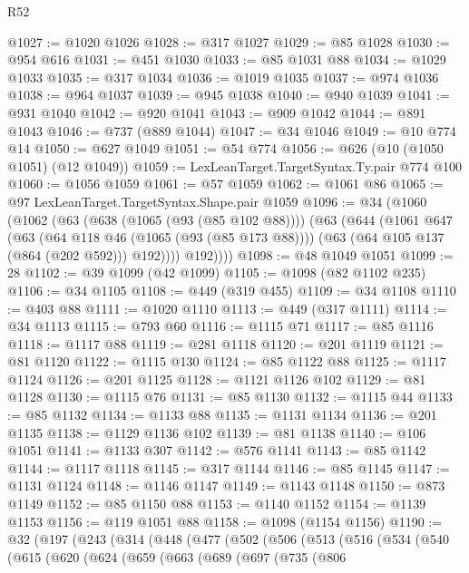 \begin{lexlean}{R52}
\begin{coremodule}
@1027 := @1020 @1026
@1028 := @317 @1027
@1029 := @85 @1028
@1030 := @954 @616
@1031 := @451 @1030
@1033 := @85 @1031 @88
@1034 := @1029 @1033
@1035 := @317 @1034
@1036 := @1019 @1035
@1037 := @974 @1036
@1038 := @964 @1037
@1039 := @945 @1038
@1040 := @940 @1039
@1041 := @931 @1040
@1042 := @920 @1041
@1043 := @909 @1042
@1044 := @891 @1043
@1046 := @737 (@889 @1044)
@1047 := @34 @1046
@1049 := @10 @774 @14
@1050 := @627 @1049
@1051 := @54 @774
@1056 := @626 (@10 (@1050 @1051) (@12 @1049))
@1059 := LexLeanTarget.TargetSyntax.Ty.pair @774 @100
@1060 := @1056 @1059
@1061 := @57 @1059
@1062 := @1061 @86
@1065 := @97 LexLeanTarget.TargetSyntax.Shape.pair @1059
@1096 := @34
    (@1060
      (@1062
        (@63
          (@638 (@1065 (@93 (@85 @102 @88))))
          (@63
            (@644
              (@1061
                @647
                (@63
                  (@64 @118 @46 (@1065 (@93 (@85 @173 @88))))
                  (@63 (@64 @105 @137 (@864 (@202 @592))) @192))))
            @192))))
@1098 := @48 @1049 @1051
@1099 := 28
@1102 := @39 @1099 (@42 @1099)
@1105 := @1098 (@82 @1102 @235)
@1106 := @34 @1105
@1108 := @449 (@319 @455)
@1109 := @34 @1108
@1110 := @403 @88
@1111 := @1020 @1110
@1113 := @449 (@317 @1111)
@1114 := @34 @1113
@1115 := @793 @60
@1116 := @1115 @71
@1117 := @85 @1116
@1118 := @1117 @88
@1119 := @281 @1118
@1120 := @201 @1119
@1121 := @81 @1120
@1122 := @1115 @130
@1124 := @85 @1122 @88
@1125 := @1117 @1124
@1126 := @201 @1125
@1128 := @1121 @1126 @102
@1129 := @81 @1128
@1130 := @1115 @76
@1131 := @85 @1130
@1132 := @1115 @44
@1133 := @85 @1132
@1134 := @1133 @88
@1135 := @1131 @1134
@1136 := @201 @1135
@1138 := @1129 @1136 @102
@1139 := @81 @1138
@1140 := @106 @1051
@1141 := @1133 @307
@1142 := @576 @1141
@1143 := @85 @1142
@1144 := @1117 @1118
@1145 := @317 @1144
@1146 := @85 @1145
@1147 := @1131 @1124
@1148 := @1146 @1147
@1149 := @1143 @1148
@1150 := @873 @1149
@1152 := @85 @1150 @88
@1153 := @1140 @1152
@1154 := @1139 @1153
@1156 := @119 @1051 @88
@1158 := @1098 (@1154 @1156)
@1190 := @32
    (@197
      (@243
        (@314
          (@448
            (@477
              (@502
                (@506
                  (@513
                    (@516
                      (@534
                        (@540
                          (@615
                            (@620
                              (@624
                                (@659
                                  (@663
                                    (@689
                                      (@697
                                        (@735
                                          (@806

\end{coremodule}
\end{lexlean}

